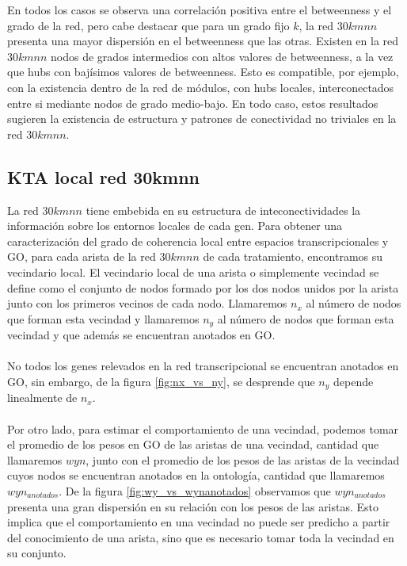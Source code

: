 En todos los casos se observa una correlación positiva entre el betweenness y el grado de la red, pero cabe destacar que para un grado fijo $k$, la red $30kmnn$ presenta una mayor dispersión en el betweenness que las otras. Existen en la red $30kmnn$ nodos de grados intermedios con altos valores de betweenness, a la vez que hubs con bajísimos valores de betweenness. Esto es compatible, por ejemplo, con la existencia dentro de la red de módulos, con hubs locales, interconectados entre si mediante nodos de grado medio-bajo. En todo caso, estos resultados sugieren la existencia de estructura y patrones de conectividad no triviales en la red $30kmnn$.
\clearpage
\subsection{KTA local red 30kmnn}
La red $30kmnn$ tiene embebida en su estructura de inteconectividades la información sobre los entornos locales de cada gen. Para obtener una caracterización del grado de coherencia local entre espacios transcripcionales y GO, para cada arista de la red $30kmnn$ de cada tratamiento, encontramos su vecindario local. El vecindario local de una arista o simplemente vecindad se define como el conjunto de nodos formado por los dos nodos unidos por la arista junto con los primeros vecinos de cada nodo. Llamaremos $n_x$ al número de nodos que forman esta vecindad y llamaremos $n_y$ al número de nodos que forman esta vecindad y que además se encuentran anotados en GO.\\\\
No todos los genes relevados en la red transcripcional se encuentran anotados en GO, sin embargo, de la figura \ref{fig:nx_vs_ny}, se desprende que $n_y$ depende linealmente de $n_x$.\\\\
Por otro lado, para estimar el comportamiento de una vecindad, podemos tomar el promedio de los pesos en GO de las aristas de una vecindad, cantidad que llamaremos $wyn$, junto con el promedio de los pesos de las aristas de la vecindad cuyos nodos se encuentran anotados en la ontología, cantidad que llamaremos $wyn_{anotados}$. De la figura \ref{fig:wy_vs_wynanotados} observamos que $wyn_{anotados}$ presenta una gran dispersión en su relación con los pesos de las aristas. Esto implica que el comportamiento en una vecindad no puede ser predicho a partir del conocimiento de una arista, sino que es necesario tomar toda la vecindad en su conjunto.\\
